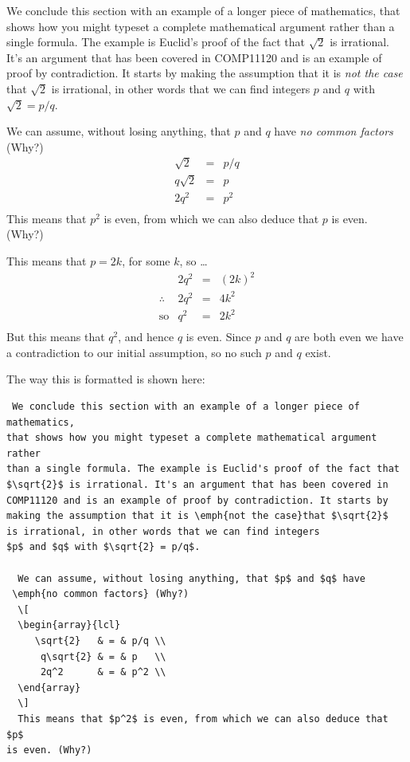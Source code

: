 \begin{refsection}
  We conclude this section with an example of a longer piece of mathematics, that shows how you might typeset a complete mathematical argument rather than a single formula. The example is Euclid's proof of the fact that $\sqrt{2}$ is irrational. It's an argument that has been covered in COMP11120 and is an example of proof by contradiction. It starts by making the assumption that it is \emph{not the case} that $\sqrt{2}$ is irrational, in other words that we can find integers $p$ and $q$ with $\sqrt{2} = p/q$.

  We can assume, without losing anything, that $p$ and $q$ have \emph{no common factors} (Why?)
  \[
  \begin{array}{lcl}
     \sqrt{2}    & = & p/q \\ 
      q\sqrt{2} & = & p   \\ 
      2q^2       & = & p^2 \\ 
  \end{array}
  \]
  This means that $p^2$ is even, from which we can also deduce that $p$ is even. (Why?)

  This means that $p = 2k$, for some $k$, so \ldots
  \[
  \begin{array}{llcl}
                       & 2q^2 & = & (2k)^2 \\ 
      \therefore & 2q^2 & = & 4k^2   \\ 
      \text{so}   & q^2   & = & 2k^2   \\
   \end{array}
  \]
  But this means that $q^2$, and hence $q$ is  even. Since $p$ and $q$ are both even we have a contradiction to our initial assumption, so no such $p$ and $q$ exist.

The way this is formatted is shown here:

{\small
\begin{verbatim}
 We conclude this section with an example of a longer piece of mathematics,
that shows how you might typeset a complete mathematical argument rather
than a single formula. The example is Euclid's proof of the fact that
$\sqrt{2}$ is irrational. It's an argument that has been covered in
COMP11120 and is an example of proof by contradiction. It starts by
making the assumption that it is \emph{not the case}that $\sqrt{2}$
is irrational, in other words that we can find integers
$p$ and $q$ with $\sqrt{2} = p/q$.

  We can assume, without losing anything, that $p$ and $q$ have
 \emph{no common factors} (Why?)
  \[
  \begin{array}{lcl}
     \sqrt{2}   & = & p/q \\ 
      q\sqrt{2} & = & p   \\ 
      2q^2      & = & p^2 \\ 
  \end{array}
  \]
  This means that $p^2$ is even, from which we can also deduce that $p$
is even. (Why?)


\end{verbatim}}
\end{refsection}
